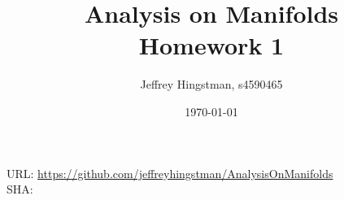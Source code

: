 \documentclass[a4paper, 12pt]{article}
\newcommand{\reponame}{https://github.com/jeffreyhingstman/AnalysisOnManifolds}    %
\begin{document}
	\title{Analysis on Manifolds \\[0.5cm] \large{Homework 1}} 
	\date{\today}
	\author{Jeffrey Hingstman, s4590465}	\maketitle
	\vspace*{\fill}
	\noindent
	URL: \url{\reponame} \\
	SHA: \commithash
	\clearpage
	
	
	

	
\end{document}
